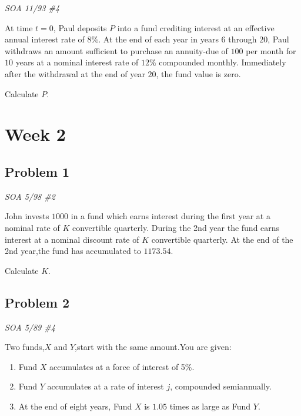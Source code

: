 \documentclass[
]{book}
\begin{document}
\emph{SOA 11/93 \#4}

At time \(t=0\), Paul deposits \(P\) into a fund crediting interest at an effective annual interest rate of \(8\%\). At the end of each year in years \(6\) through \(20\), Paul withdraws an amount sufficient to purchase an annuity-due of \(100\) per month for \(10\) years at a nominal interest rate of \(12\%\) compounded monthly. Immediately after the withdrawal at the end of year \(20\), the fund value is zero.

Calculate \(P\).

\hypertarget{week-2}{%
\section*{Week 2}\label{week-2}}

\hypertarget{problem-1-1}{%
\subsection*{Problem 1}\label{problem-1-1}}

\emph{SOA 5/98 \#2}

John invests \(1000\) in a fund which earns interest during the first year at a nominal rate of \(K\) convertible quarterly. During the 2nd year the fund earns interest at a nominal discount rate of \(K\) convertible quarterly. At the end of the 2nd year,the fund has accumulated to \(1173.54\).

Calculate \(K\).

\hypertarget{problem-2-1}{%
\subsection*{Problem 2}\label{problem-2-1}}

\emph{SOA 5/89 \#4}

Two funds,\(X\) and \(Y\),start with the same amount.You are given:

\begin{enumerate}
\def\labelenumi{\arabic{enumi}.}
\item
  Fund \(X\) accumulates at a force of interest of 5\%.
\item
  Fund \(Y\) accumulates at a rate of interest \(j\), compounded semiannually.
\item
  At the end of eight years, Fund \(X\) is \(1.05\) times as large as Fund \(Y\).
\end{enumerate}
\end{document}

